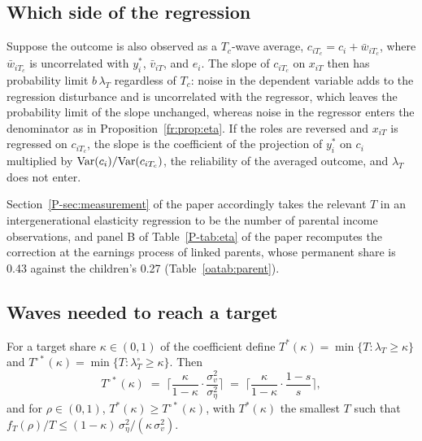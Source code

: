 \subsection{Which side of the regression}
\label{fr:sec:side}

Suppose the outcome is also observed as a $T_c$-wave average,
$c_{iT_c} = c_i + \bar w_{iT_c}$, where $\bar w_{iT_c}$ is uncorrelated
with $y^*_i$, $\bar v_{iT}$, and $e_i$. The slope of $c_{iT_c}$ on
$x_{iT}$ then has probability limit $b\,\lambda_{T}$ regardless of $T_c$:
noise in the dependent variable adds to the regression disturbance and is
uncorrelated with the regressor, which leaves the probability limit of
the slope unchanged, whereas noise in the regressor enters the denominator
as in Proposition~\ref{fr:prop:eta}. If the roles are reversed and $x_{iT}$
is regressed on $c_{iT_c}$, the slope is the coefficient of the projection
of $y^*_i$ on $c_i$ multiplied by $\mathrm{Var}(c_i)/\mathrm{Var}(c_{iT_c})$, the
reliability of the averaged outcome, and $\lambda_T$ does not enter.

Section~\ref{P-sec:measurement} of the paper accordingly takes the
relevant $T$ in an intergenerational elasticity regression to be the
number of parental income observations, and panel B of Table~\ref{P-tab:eta} of
the paper recomputes the correction at the earnings process of linked
parents, whose permanent share is 0.43 against the children's 0.27
(Table~\ref{oatab:parent}).

\subsection{Waves needed to reach a target}

\begin{proposition}
\label{fr:prop:tstar}
For a target share $\kappa \in (0,1)$ of the coefficient define
$T^*(\kappa) = \min\{T : \lambda_T \ge \kappa\}$ and
$T^{\circ *}(\kappa) = \min\{T : \lambda^{\circ}_T \ge \kappa\}$. Then
\begin{equation}
T^{\circ *}(\kappa) \;=\; \Big\lceil \frac{\kappa}{1-\kappa}\cdot\frac{\sigma^2_v}{\sigma^2_\eta} \Big\rceil
\;=\; \Big\lceil \frac{\kappa}{1-\kappa}\cdot\frac{1-s}{s} \Big\rceil ,
\label{fr:eq:tstar}
\end{equation}
and for $\rho \in (0,1)$, $T^*(\kappa) \ge T^{\circ *}(\kappa)$, with
$T^*(\kappa)$ the smallest $T$ such that
$f_T(\rho)/T \le (1-\kappa)\,\sigma^2_\eta/(\kappa\,\sigma^2_v)$.
\end{proposition}

